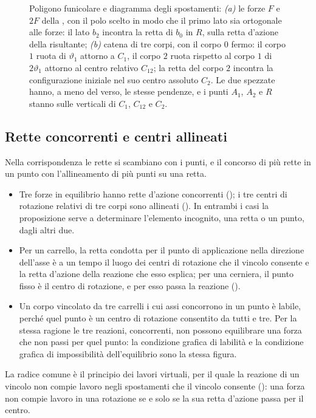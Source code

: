 \begin{figure}[htbp]
	\centering
	\caption{Poligono funicolare e diagramma degli spostamenti: \emph{(a)} le forze $F$ e $2F$
		della , con il polo scelto in modo che il primo lato sia ortogonale
		alle forze: il lato $b_2$ incontra la retta di $b_0$ in $R$, sulla retta d'azione della
		risultante; \emph{(b)} catena di tre corpi, con il corpo $0$ fermo: il corpo $1$ ruota di
		$\vartheta_1$ attorno a $C_1$, il corpo $2$ ruota rispetto al corpo $1$ di $2\vartheta_1$
		attorno al centro relativo $C_{12}$; la retta del corpo $2$ incontra la configurazione
		iniziale nel suo centro assoluto $C_2$. Le due spezzate hanno, a meno del verso, le stesse
		pendenze, e i punti
		$A_1$, $A_2$ e $R$ stanno sulle verticali di $C_1$, $C_{12}$ e $C_2$.}
	\label{fig:dualita_sgr}
\end{figure}

\subsection{Rette concorrenti e centri allineati}
\label{sec:concorrenza_sgr}

Nella corrispondenza le rette si scambiano con i punti, e il concorso di più rette in un punto
con l'allineamento di più punti su una retta.
\begin{itemize}
	\item Tre forze in equilibrio hanno rette d'azione concorrenti (); i
	tre centri di rotazione relativi di tre corpi sono allineati
	(). In entrambi i casi la proposizione serve a determinare
	l'elemento incognito, una retta o un punto, dagli altri due.
	\item Per un carrello, la retta condotta per il punto di applicazione nella direzione dell'asse è
	a un tempo il luogo dei centri di rotazione che il vincolo consente e la retta d'azione della
	reazione che esso esplica; per una cerniera, il punto fisso è il centro di rotazione, e per esso
	passa la reazione ().
	\item Un corpo vincolato da tre carrelli i cui assi concorrono in un punto è labile, perché quel
	punto è un centro di rotazione consentito da tutti e tre. Per la stessa ragione le tre reazioni,
	concorrenti, non possono equilibrare una forza che non passi per quel punto: la condizione
	grafica di labilità e la condizione grafica di impossibilità dell'equilibrio sono la stessa
	figura.
\end{itemize}
La radice comune è il principio dei lavori virtuali, per il quale la reazione di un vincolo non
compie lavoro negli spostamenti che il vincolo consente (): una forza non
compie lavoro in una rotazione se e solo se la sua retta d'azione passa per il centro.

